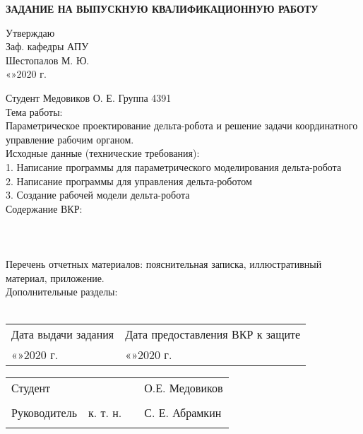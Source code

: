 
\newpage
\begin{center}
\large{\textbf{ЗАДАНИЕ НА ВЫПУСКНУЮ КВАЛИФИКАЦИОННУЮ РАБОТУ}}\\
\end{center}
\begin{flushright}
Утверждаю\\
Заф. кафедры АПУ\\
\underline{\hspace{3cm}} Шестопалов М. Ю.\\
«\underline{\hspace{0.7cm}}»\underline{\hspace{3cm}}2020 г.
\end{flushright}

\hfill \break
Студент Медовиков О. Е. \hspace{7cm} Группа 4391\\
Тема работы:\\ Параметрическое проектирование дельта-робота и решение задачи координатного управление рабочим органом.\\
Исходные данные (технические требования): \\
1. Написание программы для параметрического моделирования дельта-робота\\
2. Написание программы для управления дельта-роботом\\
3. Создание рабочей модели дельта-робота\\
Содержание ВКР:\\
\\\\\\
Перечень отчетных материалов: пояснительная записка, иллюстративный материал, приложение.\\
Дополнительные разделы:\\\\

\begin{tabular}{p{240pt}l}
	Дата выдачи задания & Дата предоставления ВКР к защите\\
	«\underline{\hspace{0.7cm}}»\underline{\hspace{3cm}}2020 г. &  «\underline{\hspace{0.7cm}}»\underline{\hspace{3cm}}2020 г.\\
\end{tabular}
\hfill \break
\hfill \break
\hfill \break
\hfill \break
\begin{tabular}{p{150pt} p{} ll}
Студент & & \underline{\hspace{3cm}} & О.Е. Медовиков\\\\
Руководитель & к. т. н. & \underline{\hspace{3cm}} &С. Е. Абрамкин\\\\
\end{tabular}
\thispagestyle{empty} %

